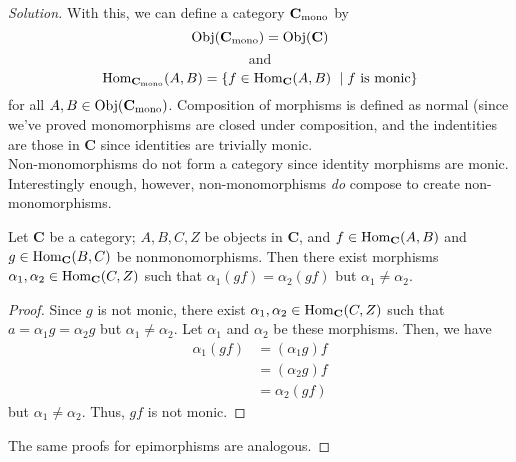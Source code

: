 \documentclass[12pt]{article}
\newenvironment{proposition}[1][Proposition]{\begin{trivlist}
\item[\hskip \labelsep {\bfseries #1.}]}{\end{trivlist}}
\newcommand{\catname}[1]{\normalfont\textbf{#1}}
\newcommand{\Hom}{\text{Hom}}
\newcommand{\Objj}{\text{Obj}}
\newcommand{\Obj}[1]{\text{Obj}(\catname{C})}
\newenvironment{solution}
  {\renewcommand\qedsymbol{$\blacksquare$}\begin{proof}[Solution]}
{\end{proof}}
\newenvironment{sproof}{%
  \renewcommand\qedsymbol{$\square$}
  \begin{proof}
  }{
  \end{proof}
}
\begin{document}
\begin{solution}
      With this, we can define a category $\catname{C}_\text{mono}$ by 
      \begin{equation*}
        \Objj(\catname{C}_\text{mono}) = \Obj{C}
      \end{equation*} 
      \[\text{and} \]
      \begin{equation*}
        \Hom_{\catname{C}_\text{mono}}(A,B) = \{f \in \Hom_{\catname{C}}(A,B)\ \mid f \text{ is monic}\}
      \end{equation*} 
      for all $A, B \in \Objj(\catname{C}_\text{mono})$.
      Composition of morphisms is defined as normal (since we've proved monomorphisms are closed under composition, and the indentities are those in \catname{C} since identities are trivially monic. \\
        Non-monomorphisms do not form a category since identity morphisms are monic. 
        Interestingly enough, however, non-monomorphisms \textit{do} compose to create non-monomorphisms.
        \begin{proposition}
          Let \catname{C} be a category;
          $A,B,C,Z$ be objects in \catname{C}, and
          $f\in \Hom_{\catname{C}}(A,B)$ and
          $g\in \Hom_{\catname{C}}(B,C)$
          be nonmonomorphisms. Then there exist morphisms
          $\alpha_1, \alpha_2 \in \Hom_{\catname{C}}(C,Z)$ such that
          $\alpha_1(gf) = \alpha_2(gf)$ but $\alpha_1\neq \alpha_2$.
        \end{proposition}
        \begin{sproof}
          Since $g$ is not monic, there exist $\alpha_1, \alpha_2 \in \Hom_{\catname{C}}(C,Z)$ such that $a=\alpha_1g = \alpha_2g$ but $\alpha_1\neq \alpha_2$. 
          Let $\alpha_1$ and $\alpha_2$ be these morphisms. Then, we have
          \begin{align*}
            \alpha_1(gf) &= (\alpha_1g)f\\
            &= (\alpha_2g)f \\
            &= \alpha_2(gf)
          \end{align*}
          but $\alpha_1\neq \alpha_2$. Thus, $gf$ is not monic.
        \end{sproof}
        The same proofs for epimorphisms are analogous.
\end{solution}

\newpage
\end{document}
